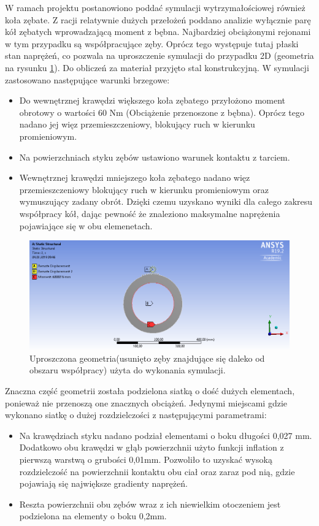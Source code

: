 W ramach projektu postanowiono poddać symulacji wytrzymałościowej również koła zębate.
    Z racji relatywnie dużych przełożeń poddano analizie wyłącznie parę kół zębatych wprowadzającą moment z bębna.
    Najbardziej obciążonymi rejonami w tym przypadku są współpracujące zęby.
    Oprócz tego występuje tutaj płaski stan naprężeń, co pozwala na uproszczenie symulacji do przypadku 2D (geometria na rysunku \ref{fig::geometria_plus_BC_przekladnia}). 
    Do obliczeń za materiał przyjęto stal konstrukcyjną.
    W symulacji zastosowano następujące warunki brzegowe:
    
    \begin{itemize}
    	\item Do wewnętrznej krawędzi większego koła zębatego przyłożono moment obrotowy o wartości 60 Nm (Obciążenie przenoszone z bębna). Oprócz tego nadano jej więz przemieszczeniowy, blokujący ruch w kierunku promieniowym.
    	\item Na powierzchniach styku zębów ustawiono warunek kontaktu z tarciem.
    	\item Wewnętrznej krawędzi mniejszego koła zębatego nadano więz przemieszczeniowy blokujący ruch w kierunku promieniowym oraz wymuszujący zadany obrót. Dzięki czemu uzyskano wyniki dla całego zakresu współpracy kół, dając pewność że znaleziono maksymalne naprężenia pojawiające się w obu elemenetach. 
    \end{itemize}
    

    \begin{figure}[th]
    	\centering
    	\includegraphics[width=0.9\linewidth]{Obliczenia/geometria_plus_BC_przekladnia}
    	\caption{Uproszczona geometria(usunięto zęby znajdujące się daleko od obszaru współpracy) użyta do wykonania symulacji.} 
    	\label{fig::geometria_plus_BC_przekladnia}
    \end{figure}

Znaczna część geometrii została podzielona siatką o dość dużych elementach, ponieważ nie przenoszą one znacznych obciążeń.
Jedynymi miejscami gdzie wykonano siatkę o dużej rozdzielczości z następującymi parametrami:
\begin{itemize}
	\item Na krawędziach styku nadano podział elementami o boku długości 0,027 mm. Dodatkowo obu krawędzi w głąb powierzchnii użyto funkcji inflation z pierwszą warstwą o grubości 0,01mm. Pozwoliło to uzyskać wysoką rozdzielczość na powierzchnii kontaktu obu ciał oraz zaraz pod nią, gdzie pojawiają się największe gradienty naprężeń.
	\item Reszta powierzchnii obu zębów wraz z ich niewielkim otoczeniem jest podzielona na elementy o boku 0,2mm.
	
\end{itemize}

